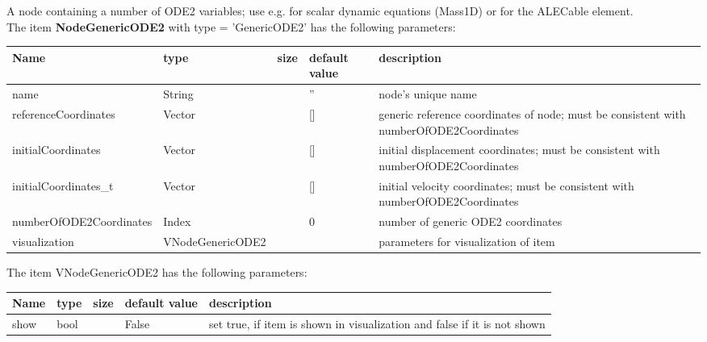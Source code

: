 A node containing a number of ODE2 variables; use e.g. for scalar dynamic equations (Mass1D) or for the ALECable element.
 \\\vspace{12pt} \noindent The item {\bf NodeGenericODE2} with type = 'GenericODE2' has the following parameters:\vspace{-1cm}\\ 
\begin{center}
  \footnotesize
  \begin{longtable}{| p{4.5cm} | p{2.5cm} | p{0.5cm} | p{2.5cm} | p{6cm} |}
    \hline
    \bf Name & \bf type & \bf size & \bf default value & \bf description \\ \hline
    name &     String &      &     '' &     node's unique name\\ \hline
    referenceCoordinates &     Vector &      &     [] &     generic reference coordinates of node; must be consistent with numberOfODE2Coordinates\\ \hline
    initialCoordinates &     Vector &      &     [] &     initial displacement coordinates; must be consistent with numberOfODE2Coordinates\\ \hline
    initialCoordinates\_t &     Vector &      &     [] &     initial velocity coordinates; must be consistent with numberOfODE2Coordinates\\ \hline
    numberOfODE2Coordinates &     Index &      &     0 &     number of generic ODE2 coordinates\\ \hline
    visualization & VNodeGenericODE2 & & & parameters for visualization of item \\ \hline
	  \end{longtable}
	\end{center}
The item VNodeGenericODE2 has the following parameters:\vspace{-1cm}\\ 
\begin{center}
  \footnotesize
  \begin{longtable}{| p{4.5cm} | p{2.5cm} | p{0.5cm} | p{2.5cm} | p{6cm} |}
    \hline
    \bf Name & \bf type & \bf size & \bf default value & \bf description \\ \hline
    show &     bool &      &     False &     set true, if item is shown in visualization and false if it is not shown\\ \hline
	  \end{longtable}
	\end{center}
